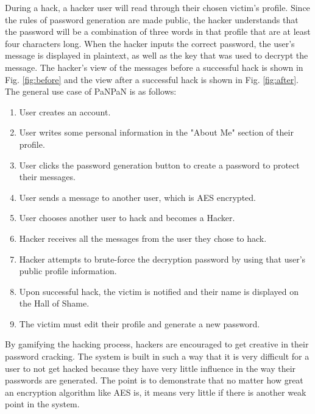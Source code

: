 \documentclass[conference]{csce}
\begin{document}
\indent During a hack, a hacker user will read through their chosen victim's profile. Since the rules of password generation are made public, the hacker understands that the password will be a combination of three words in that profile that are at least four characters long. When the hacker inputs the correct password, the user's message is displayed in plaintext, as well as the key that was used to decrypt the message. The hacker's view of the messages before a successful hack is shown in Fig. \ref{fig:before} and the view after a successful hack is shown in Fig. \ref{fig:after}.
\\ \indent The general use case of PaNPaN is as follows: 
\begin{enumerate}
    \item User creates an account.
    \item User writes some personal information in the "About Me" section of their profile.
    \item User clicks the password generation button to create a password to protect their messages.
    \item User sends a message to another user, which is AES encrypted.
    \item User chooses another user to hack and becomes a Hacker.
    \item Hacker receives all the messages from the user they chose to hack.
    \item Hacker attempts to brute-force the decryption password by using that user's public profile information.
    \item Upon successful hack, the victim is notified and their name is displayed on the Hall of Shame.
    \item The victim must edit their profile and generate a new password.\\
\end{enumerate}
\indent By gamifying the hacking process, hackers are encouraged to get creative in their password cracking. The system is built in such a way that it is very difficult for a user to not get hacked because they have very little influence in the way their passwords are generated. The point is to demonstrate that no matter how great an encryption algorithm like AES is, it means very little if there is another weak point in the system.
\end{document}
